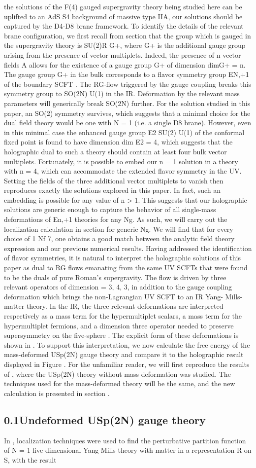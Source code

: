\documentclass{article}
\begin{document}
\sloppy

the solutions of the F(4) gauged supergravity theory being studied here can be uplifted to
an AdS  S4 background of massive type IIA, our solutions should be captured by the D4-D8
brane framework. To identify the details of the relevant brane configuration, we first recall
from section that the group which is gauged in the supergravity theory is SU(2)R  G+, where
G+ is the additional gauge group arising from the presence of vector multiplets. Indeed, the
presence of n vector fields A allows for the existence of a gauge group G+ of dimension
dimG+ = n. The gauge group G+ in the bulk corresponds to a flavor symmetry group
EN,+1 of the boundary SCFT . The RG-flow triggered by the gauge coupling breaks this
symmetry group to SO(2N)  U(1) in the IR. Deformation by the relevant mass parameters
will generically break SO(2N) further. For the solution studied in this paper, an SO(2)
symmetry survives, which suggests that a minimal choice for the dual field theory would be
one with N = 1 (i.e. a single D8 brane). However, even in this minimal case the enhanced
gauge group E2  SU(2)  U(1) of the conformal fixed point is found to have dimension
dim E2 = 4, which suggests that the holographic dual to such a theory should contain at
least four bulk vector multiplets. Fortunately, it is possible to embed our n = 1 solution
in a theory with n = 4, which can accommodate the extended flavor symmetry in the UV.
Setting the fields of the three additional vector multiplets to vanish then reproduces exactly
the solutions explored in this paper. In fact, such an embedding is possible for any value
of n > 1. This suggests that our holographic solutions are generic enough to capture the
behavior of all single-mass deformations of En,+1 theories for any Ng. As such, we will carry
out the localization calculation in section for generic Ng. We will find that for every choice
of 1  Nf  7, one obtains a good match between the analytic field theory expression and
our previous numerical results. Having addressed the identification of flavor symmetries, it
is natural to interpret the holographic solutions of this paper as dual to RG flows emanating
from the same UV SCFTs that were found to be the duals of pure Roman's supergravity.
The flow is driven by three relevant operators of dimension  = 3, 4, 3, in addition to the
gauge coupling deformation which brings the non-Lagrangian UV SCFT to an IR Yang-
Mills-matter theory. In the IR, the three relevant deformations are interpreted respectively
as a mass term for the hypermultiplet scalars, a mass term for the hypermultiplet fermions,
and a dimension three operator needed to preserve supersymmetry on the five-sphere . The
explicit form of these deformations is shown in . To support this interpretation, we now
calculate the free energy of the mass-deformed USp(2N) gauge theory and compare it to the
holographic result displayed in Figure . For the unfamiliar reader, we will first reproduce
the results of , where the USp(2N) theory without mass deformation was studied. The
techniques used for the mass-deformed theory will be the same, and the new calculation is
presented in section .


\subsection*{0.1Undeformed USp(2N) gauge theory}


In , localization techniques were used to find the perturbative partition function of N = 1
five-dimensional Yang-Mills theory with matter in a representation R on S, with the result
\end{document}
